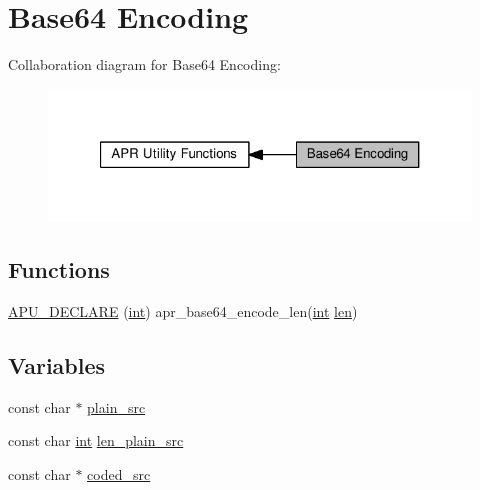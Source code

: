 \hypertarget{group__APR__Util__Base64}{}\section{Base64 Encoding}
\label{group__APR__Util__Base64}
Collaboration diagram for Base64 Encoding\+:
\nopagebreak
\begin{figure}[H]
\begin{center}
\leavevmode
\includegraphics[width=321pt]{group__APR__Util__Base64}
\end{center}
\end{figure}
\subsection*{Functions}
\begin{DoxyCompactItemize}
\item 
\hyperlink{group__APR__Util__Base64_gaf43a293bb29d7041e6c85e90b967715f}{A\+P\+U\+\_\+\+D\+E\+C\+L\+A\+RE} (\hyperlink{pcre_8txt_a42dfa4ff673c82d8efe7144098fbc198}{int}) apr\+\_\+base64\+\_\+encode\+\_\+len(\hyperlink{pcre_8txt_a42dfa4ff673c82d8efe7144098fbc198}{int} \hyperlink{group__APR__Util__XML_ga1e9401816e3a1cf930f448db46978ea7}{len})
\end{DoxyCompactItemize}
\subsection*{Variables}
\begin{DoxyCompactItemize}
\item 
const char $\ast$ \hyperlink{group__APR__Util__Base64_ga4cb0359205d009041bb10a3a24ad47a5}{plain\+\_\+src}
\item 
const char \hyperlink{pcre_8txt_a42dfa4ff673c82d8efe7144098fbc198}{int} \hyperlink{group__APR__Util__Base64_ga23d56ef91e6602387e96a5ae6b3bd7d4}{len\+\_\+plain\+\_\+src}
\item 
const char $\ast$ \hyperlink{group__APR__Util__Base64_ga08926cbeac2cf20ecb41b19c6c5ee914}{coded\+\_\+src}
\end{DoxyCompactItemize}


